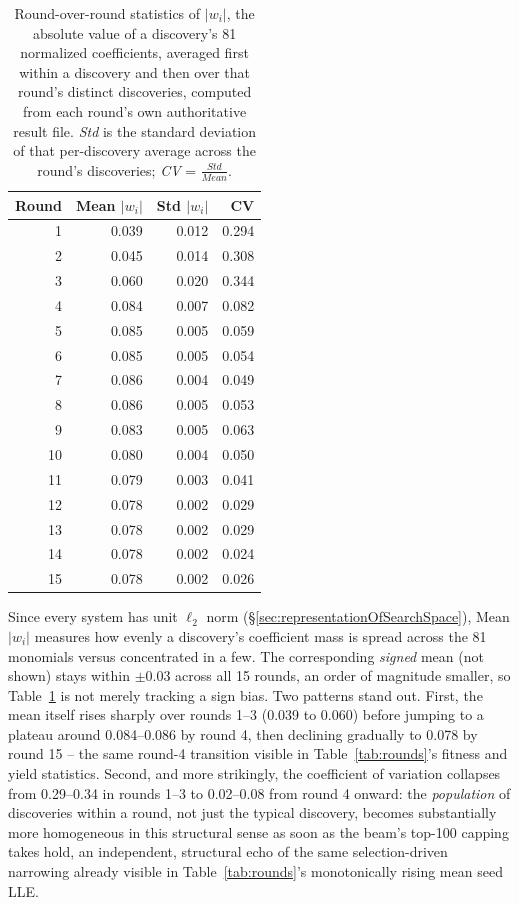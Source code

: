 \documentclass[11pt]{article}
\begin{document}
\begin{table}[htbp]
\centering
\footnotesize
\caption{Round-over-round statistics of $|w_i|$, the absolute value of a
discovery's 81 normalized coefficients, averaged first within a discovery
and then over that round's distinct discoveries, computed from each
round's own authoritative result file. \emph{Std} is the standard deviation
of that per-discovery average across the round's discoveries; \emph{CV} =
$\frac{\mathit{Std}}{\mathit{Mean}}$.}
\label{tab:coefstructure}
\begin{tabular}{rrrr}
\toprule
Round & Mean $|w_i|$ & Std $|w_i|$ & CV \\
\midrule
1  & 0.039 & 0.012 & 0.294 \\
2  & 0.045 & 0.014 & 0.308 \\
3  & 0.060 & 0.020 & 0.344 \\
4  & 0.084 & 0.007 & 0.082 \\
5  & 0.085 & 0.005 & 0.059 \\
6  & 0.085 & 0.005 & 0.054 \\
7  & 0.086 & 0.004 & 0.049 \\
8  & 0.086 & 0.005 & 0.053 \\
9  & 0.083 & 0.005 & 0.063 \\
10 & 0.080 & 0.004 & 0.050 \\
11 & 0.079 & 0.003 & 0.041 \\
12 & 0.078 & 0.002 & 0.029 \\
13 & 0.078 & 0.002 & 0.029 \\
14 & 0.078 & 0.002 & 0.024 \\
15 & 0.078 & 0.002 & 0.026 \\
\bottomrule
\end{tabular}
\end{table}

Since every system has unit $\ell_2$ norm (\S\ref{sec:representationOfSearchSpace}), Mean
$|w_i|$ measures how evenly a discovery's coefficient mass is spread across
the 81 monomials versus concentrated in a few. The corresponding
\emph{signed} mean (not shown) stays within $\pm 0.03$ across all 15
rounds, an order of magnitude smaller, so Table~\ref{tab:coefstructure} is
not merely tracking a sign bias. Two patterns stand out. First, the mean
itself rises sharply over rounds 1--3 (0.039 to 0.060) before jumping to a
plateau around 0.084--0.086 by round 4, then declining gradually to 0.078
by round 15 -- the same round-4 transition visible in
Table~\ref{tab:rounds}'s fitness and yield statistics. Second, and more
strikingly, the coefficient of variation collapses from 0.29--0.34 in
rounds 1--3 to 0.02--0.08 from round 4 onward: the \emph{population} of
discoveries within a round, not just the typical discovery, becomes
substantially more homogeneous in this structural sense as soon as the
beam's top-100 capping takes hold, an independent, structural echo of the
same selection-driven narrowing already visible in Table~\ref{tab:rounds}'s
monotonically rising mean seed LLE.
\end{document}
